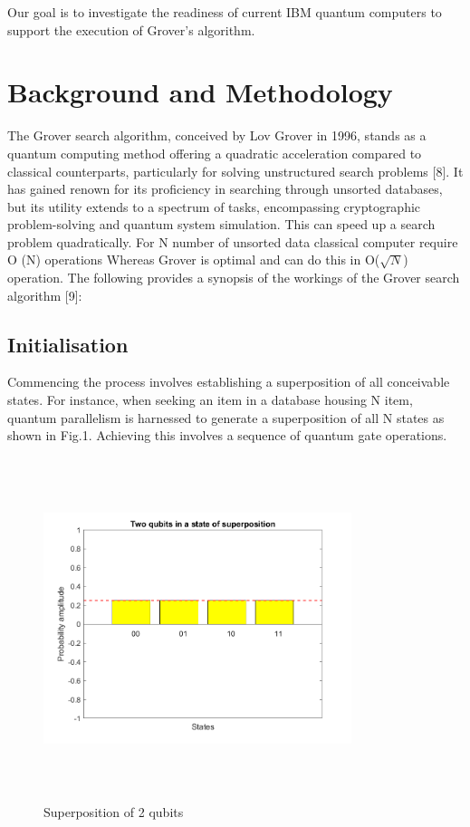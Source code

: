 \documentclass[conference]{IEEEtran}
\begin{document}
Our goal is to investigate the readiness of current IBM quantum computers to support the execution of Grover's algorithm.

\section{Background and Methodology}

The Grover search algorithm, conceived by Lov Grover
in 1996, stands as a quantum computing method offering
a quadratic acceleration compared to classical counterparts,
particularly for solving unstructured search problems [8]. It
has gained renown for its proficiency in searching through
unsorted databases, but its utility extends to a spectrum
of tasks, encompassing cryptographic problem-solving and
quantum system simulation. This can speed up a search
problem quadratically. For N number of unsorted data classical
computer require O (N) operations Whereas Grover is optimal
and can do this in O($ \sqrt{N} $) operation. The following provides
a synopsis of the workings of the Grover search algorithm [9]:
\subsection{Initialisation}
Commencing the process involves establishing a superposition of all conceivable states. For instance, when seeking an
item in a database housing N item, quantum parallelism is
harnessed to generate a superposition of all N states as shown
in Fig.1. Achieving this involves a sequence of quantum gate
operations.

\begin{figure}[htbp]
	\centerline{\includegraphics[width=9cm,height=10cm,keepaspectratio]{fig1.png}}
	\caption{Superposition of 2 qubits}
	\label{fig1}
\end{figure}
\end{document}
